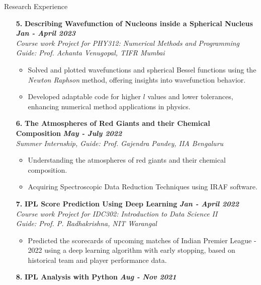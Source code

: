 \documentclass{resume} %
\begin{document}
\begin{rSection}{Research Experience}
\begin{enumerate}
\begin{itemize}
    \end{itemize}
\vspace{0.3cm}
    \item[\textbf{5.}] {\bf Describing Wavefunction of Nucleons inside a Spherical Nucleus} \hfill {\em \bf Jan - April 2023}\\
    \textit{Course work Project for PHY312: Numerical Methods and Programming\\Guide: Prof. Achanta Venugopal, TIFR Mumbai}
    \begin{itemize}
    \itemsep -5pt
        \item Solved and plotted wavefunctions and spherical Bessel functions using the \textit{Newton Raphson} method, offering insights into wavefunction behavior.
        \item Developed adaptable code for higher \( l \) values and lower tolerances, enhancing numerical method applications in physics.
    \end{itemize}
\vspace{0.3cm}
    \item[\textbf{6.}] {\bf The Atmospheres of Red Giants and their Chemical Composition} \hfill {\em \bf May - July 2022}\\
    \textit{Summer Internship, Guide: Prof. Gajendra Pandey, IIA Bengaluru}
    \begin{itemize}
    \itemsep -5pt
        \item Understanding the atmospheres of red giants and their chemical composition.
        \item Acquiring Spectroscopic Data Reduction Techniques using IRAF software.
    \end{itemize}
\vspace{0.3cm}
    \item[\textbf{7.}] {\bf IPL Score Prediction Using Deep Learning} \hfill {\em \bf Jan - April 2022}\\
    \textit{Course work Project for IDC302: Introduction to Data Science II\\Guide: Prof. P. Radhakrishna, NIT Warangal}
    \begin{itemize}
        \item Predicted the scorecards of upcoming matches of Indian Premier League - 2022 using a deep learning algorithm with early stopping, based on historical team and player performance data.
    \end{itemize}
\vspace{0.3cm}
    \item[\textbf{8.}] {\bf IPL Analysis with Python} \hfill {\em \bf Aug - Nov 2021}\\

\end{enumerate}
\end{rSection}
\end{document}
